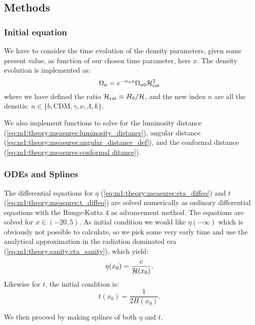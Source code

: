\subsection{Methods}\label{sec:m1:methods}

\subsubsection{Initial equation}
    We have to consider the time evolution of the density parameters, given some present value, as function of our chosen time parameter, here $x$. The density evolution is implemented as:
    \begin{equation}\label{eq:m1:methods:initial:density_evolution}
        \Omega_n = e^{-\alpha_nx}\Omega_{n0}\mathcal{H}_\mathrm{rat}^2
    \end{equation}
    where we have defined the ratio $\mathcal{H}_\mathrm{rat} \equiv H_0/\mathcal{H}$, and the new index $n$ are all the densitis: $n\in\{b, \mathrm{CDM}, \gamma, \nu, \Lambda, k\}$.

    We also implement functions to solve for the luminosity distance (\cref{eq:m1:theory:measures:luminosity_distance}), angular distance (\cref{eq:m1:theory:measures:angular_distance_def}), and the conformal distance (\cref{eq:m1:theory:measures:conformal ditance}).


\subsubsection{ODEs and Splines}
    The differential equations for $\eta$ (\cref{eq:m1:theory:measures:eta_diffeq}) and $t$ (\cref{eq:m1:theory:measures:t_diffeq}) are solved numerically as ordinary differential equations with the Runge-Kutta 4 as advancement method. The equations are solved for $x\in(-20,5)$. As initial condition we would like $\eta(-\infty)$ which is obviously not possible to calculate, so we pick some very early time and use the analytical approximation in the radiation dominated era (\cref{eq:m1:theory:sanity:eta_sanity}), which yield:
    \begin{equation}\label{eq:m1:methods:odes:eta_initial}
        \eta(x_0) = \frac{c}{\mathcal{H}(x_0)}.
    \end{equation}
    Likewise for $t$, the initial condition is:
    \begin{equation}\label{eq:m1:methods:odes:t_initial}
        t(x_0) = \frac{1}{2H(x_0)}.
    \end{equation}
    
    We then proceed by making splines of both $\eta$ and $t$. 

    